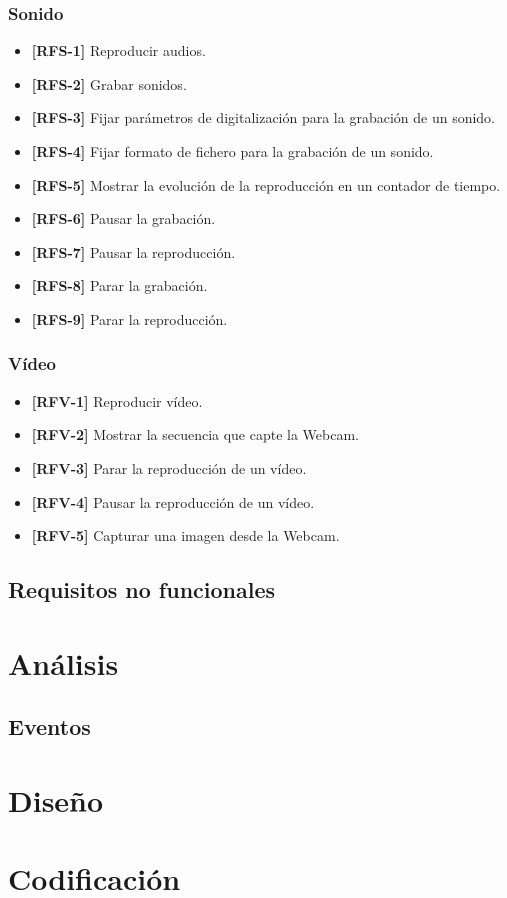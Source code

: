\subsubsection{Sonido}
\begin{itemize}
\item{\textbf{[RFS-1]} Reproducir audios.}
\item{\textbf{[RFS-2]} Grabar sonidos.}
\item{\textbf{[RFS-3]} Fijar parámetros de digitalización para la grabación de un sonido.}
\item{\textbf{[RFS-4]} Fijar formato de fichero para la grabación de un sonido.}
\item{\textbf{[RFS-5]} Mostrar la evolución de la reproducción en un contador de tiempo.}
\item{\textbf{[RFS-6]} Pausar la grabación.}
\item{\textbf{[RFS-7]} Pausar la reproducción.}
\item{\textbf{[RFS-8]} Parar la grabación.}
\item{\textbf{[RFS-9]} Parar la reproducción.}
\end{itemize}
\subsubsection{Vídeo}
\begin{itemize}
\item{\textbf{[RFV-1]} Reproducir vídeo.}
\item{\textbf{[RFV-2]} Mostrar la secuencia que capte la Webcam.}
\item{\textbf{[RFV-3]} Parar la reproducción de un vídeo.}
\item{\textbf{[RFV-4]} Pausar la reproducción de un vídeo.}
\item{\textbf{[RFV-5]} Capturar una imagen desde la Webcam.}
\end{itemize}
\subsection{Requisitos no funcionales}
\section{Análisis}
\subsection{Eventos}
\section{Diseño}

\section{Codificación}




